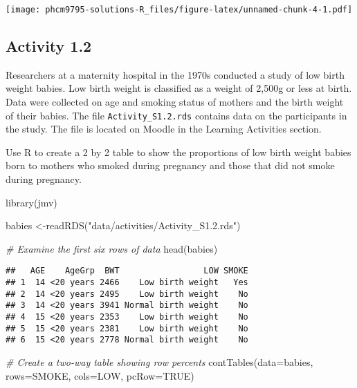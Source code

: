 \documentclass[
]{memoir}
\newenvironment{Shaded}{\begin{snugshade}}{\end{snugshade}}
\newcommand{\AttributeTok}[1]{\textcolor[rgb]{0.77,0.63,0.00}{#1}}
\newcommand{\CommentTok}[1]{\textcolor[rgb]{0.56,0.35,0.01}{\textit{#1}}}
\newcommand{\ConstantTok}[1]{\textcolor[rgb]{0.00,0.00,0.00}{#1}}
\newcommand{\FunctionTok}[1]{\textcolor[rgb]{0.00,0.00,0.00}{#1}}
\newcommand{\NormalTok}[1]{#1}
\newcommand{\OtherTok}[1]{\textcolor[rgb]{0.56,0.35,0.01}{#1}}
\newcommand{\StringTok}[1]{\textcolor[rgb]{0.31,0.60,0.02}{#1}}
\begin{document}
\texttt{[image: phcm9795-solutions-R\_files/figure-latex/unnamed-chunk-4-1.pdf]}

\hypertarget{activity-1.2}{%
\subsection*{Activity 1.2}\label{activity-1.2}}

Researchers at a maternity hospital in the 1970s conducted a study of low birth weight babies. Low birth weight is classified as a weight of 2,500g or less at birth. Data were collected on age and smoking status of mothers and the birth weight of their babies. The file \texttt{Activity\_S1.2.rds} contains data on the participants in the study. The file is located on Moodle in the Learning Activities section.

Use R to create a 2 by 2 table to show the proportions of low birth weight babies born to mothers who smoked during pregnancy and those that did not smoke during pregnancy.

\begin{Shaded}
\begin{Highlighting}[]
\FunctionTok{library}\NormalTok{(jmv)}

\NormalTok{babies }\OtherTok{\textless{}{-}}\FunctionTok{readRDS}\NormalTok{(}\StringTok{"data/activities/Activity\_S1.2.rds"}\NormalTok{)}

\CommentTok{\# Examine the first six rows of data}
\FunctionTok{head}\NormalTok{(babies)}
\end{Highlighting}
\end{Shaded}

\begin{verbatim}
##   AGE    AgeGrp  BWT                 LOW SMOKE
## 1  14 <20 years 2466    Low birth weight   Yes
## 2  14 <20 years 2495    Low birth weight    No
## 3  14 <20 years 3941 Normal birth weight    No
## 4  15 <20 years 2353    Low birth weight    No
## 5  15 <20 years 2381    Low birth weight    No
## 6  15 <20 years 2778 Normal birth weight    No
\end{verbatim}

\begin{Shaded}
\begin{Highlighting}[]
\CommentTok{\# Create a two{-}way table showing row percents}
\FunctionTok{contTables}\NormalTok{(}\AttributeTok{data=}\NormalTok{babies, }\AttributeTok{rows=}\NormalTok{SMOKE, }\AttributeTok{cols=}\NormalTok{LOW, }\AttributeTok{pcRow=}\ConstantTok{TRUE}\NormalTok{)}
\end{Highlighting}
\end{Shaded}
\end{document}
